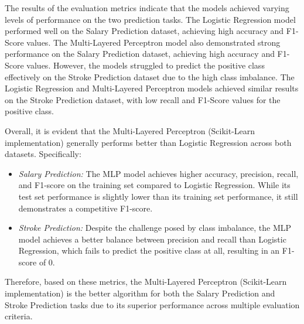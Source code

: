 \documentclass[runningheads]{paper}
\begin{document}
The results of the evaluation metrics indicate that the models achieved varying
levels of performance on the two prediction tasks. The Logistic Regression model
performed well on the Salary Prediction dataset, achieving high accuracy and F1-Score
values. The Multi-Layered Perceptron model also demonstrated strong performance on
the Salary Prediction dataset, achieving high accuracy and F1-Score values. However,
the models struggled to predict the positive class effectively
on the Stroke Prediction dataset due to the high class imbalance. The Logistic
Regression and Multi-Layered Perceptron models achieved similar results on the
Stroke Prediction dataset, with low recall and F1-Score values for the positive class.

Overall, it is evident that the Multi-Layered Perceptron (Scikit-Learn 
implementation) generally performs better than Logistic Regression across both 
datasets. Specifically:

\begin{itemize}
    \item \textit{Salary Prediction:} The MLP model achieves higher accuracy, 
    precision, recall, and F1-score on the training set compared to Logistic
     Regression. While its test set performance is slightly lower than its 
     training set performance, it still demonstrates a competitive F1-score.
    \item \textit{Stroke Prediction:} Despite the challenge posed by class 
    imbalance, the MLP model achieves a better balance between precision and 
    recall than Logistic Regression, which fails to predict the positive class 
    at all, resulting in an F1-score of 0.
\end{itemize}

Therefore, based on these metrics, the Multi-Layered Perceptron (Scikit-Learn 
implementation) is the better algorithm for both the Salary Prediction and 
Stroke Prediction tasks due to its superior performance across multiple 
evaluation criteria.


\pagebreak
\end{document}
